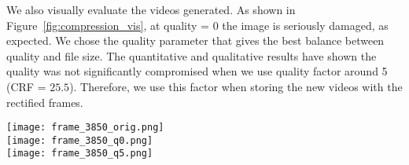 We also visually evaluate the videos generated.
As shown in Figure~\ref{fig:compression_vis}, at quality = 0 the image is seriously damaged, as expected.
We chose the quality parameter that gives the best balance between quality and file size.
The quantitative and qualitative results have shown the quality was not significantly compromised when we use quality factor around 5 (CRF = $25.5$).
Therefore, we use this factor when storing the new videos with the rectified frames.

\begin{figure*}[htb!]
	\centering
	\texttt{[image: frame\_3850\_orig.png]}\\
	\vspace{2mm}
	\texttt{[image: frame\_3850\_q0.png]}\\
	\vspace{2mm}
	\texttt{[image: frame\_3850\_q5.png]}
	\caption[Compression quality comparison]{Compression quality comparison. From up to down: frame from original video, quality = 0, and quality = 5.}
	\label{fig:compression_vis}
\end{figure*}

